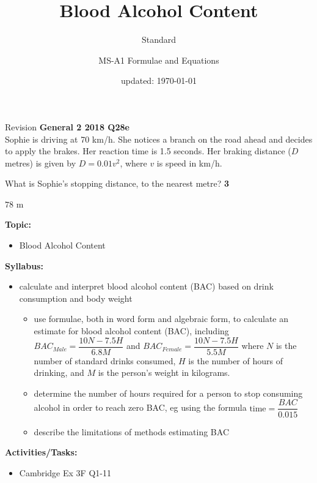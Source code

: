 \documentclass[aspectratio=169,10pt]{beamer}
\title{Blood Alcohol Content}
\subtitle{Standard}
\author{MS-A1 Formulae and Equations}
\date{updated: \today
}
\begin{document}
\begin{frame}{Revision}
\textbf{General 2 2018 Q28e}\\
    Sophie is driving at 70 km/h. She notices a branch on the road ahead and decides to apply the brakes. Her reaction time is 1.5 seconds. Her braking distance ($D$ metres) is given by $D=0.01v^2$, where $v$ is speed in km/h.
    
    What is Sophie's stopping distance, to the nearest metre? \hfill\textbf{3}\vspace{2em}\pause
  \begin{solution}[]
\pause$78$ m
    \end{solution}
\end{frame}

\frame{\titlepage}

\begin{frame}
  \begin{outcome}
    \textbf{Topic:}
    \begin{itemize}
      \item[] Blood Alcohol Content
    \end{itemize}

    \textbf{Syllabus:}
    \begin{itemize}
      \item calculate and interpret blood alcohol content (BAC) based on drink consumption and body weight
      \begin{itemize}
          \item use formulae, both in word form and algebraic form, to calculate an estimate for blood alcohol content (BAC), including $BAC_{Male}=\dfrac{10N−7.5H}{6.8M}$ and $BAC_{Female}=\dfrac{10N−7.5H}{5.5M}$ where $N$ is the number of standard drinks consumed, $H$ is the number of hours of drinking, and $M$ is the person’s weight in kilograms.
          \item determine the number of hours required for a person to stop consuming alcohol in order to reach zero BAC, eg using the formula $\text{time}=\dfrac{BAC}{0.015}$
          \item describe the limitations of methods estimating BAC
      \end{itemize}
    \end{itemize}

    \textbf{Activities/Tasks:}
    \begin{itemize}
      \item Cambridge Ex 3F Q1-11
    \end{itemize}
  \end{outcome}
\end{frame}
\end{document}
